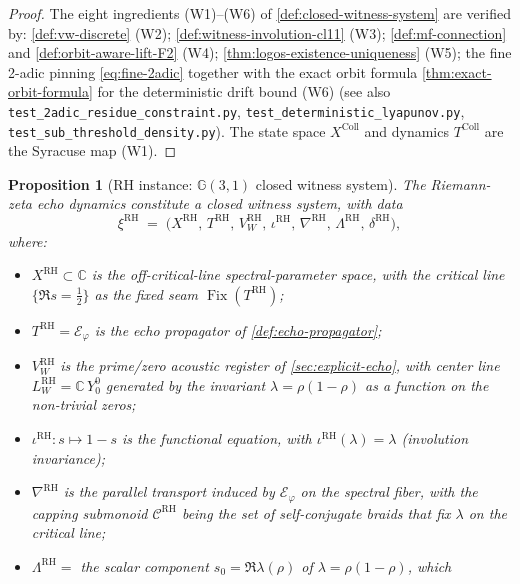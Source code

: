 \documentclass[11pt,a4paper]{article}
\theoremstyle{plain}
\newtheorem{proposition}[theorem]{Proposition}
\theoremstyle{definition}
\theoremstyle{remark}
\numberwithin{equation}{section}
\newcommand{\Cl}{\mathbb{G}}
\newcommand{\Complex}{\mathbb{C}}
\newcommand{\vp}{\varphi}
\DeclareMathOperator{\Fix}{Fix}
\begin{document}
\begin{proof}
The eight ingredients (W1)--(W6) of \cref{def:closed-witness-system}
are verified by:
\cref{def:vw-discrete} (W2);
\cref{def:witness-involution-cl11} (W3);
\cref{def:mf-connection} and \cref{def:orbit-aware-lift-F2} (W4);
\cref{thm:logos-existence-uniqueness} (W5);
the fine 2-adic pinning \eqref{eq:fine-2adic} together with the
exact orbit formula \cref{thm:exact-orbit-formula} for the
deterministic drift bound (W6) (see also
\texttt{test\_2adic\_residue\_constraint.py},
\texttt{test\_deterministic\_lyapunov.py},
\texttt{test\_sub\_threshold\_density.py}).
The state space $X^{\text{Coll}}$ and dynamics $T^{\text{Coll}}$
are the Syracuse map (W1).
\end{proof}

\begin{proposition}[RH instance: $\Cl(3,1)$ closed witness system]
\label{prop:rh-closed-witness-system}
The Riemann-zeta echo dynamics constitute a closed witness
system, with data
\[
  \xi^{\text{RH}}\;=\;\bigl(
    X^{\text{RH}},\,T^{\text{RH}},\,V_W^{\text{RH}},\,
    \iota^{\text{RH}},\,\nabla^{\text{RH}},\,
    \Lambda^{\text{RH}},\,\delta^{\text{RH}}
  \bigr),
\]
where:
\begin{itemize}
  \item $X^{\text{RH}}\subset\Complex$ is the off-critical-line
        spectral-parameter space, with the critical line
        $\{\Re s=\tfrac12\}$ as the fixed seam $\Fix(T^{\text{RH}})$;
  \item $T^{\text{RH}}=\mathcal{E}_\vp$ is the echo propagator
        of \cref{def:echo-propagator};
  \item $V_W^{\text{RH}}$ is the prime/zero acoustic register of
        \cref{sec:explicit-echo}, with center line
        $L_W^{\text{RH}}=\Complex\,Y_0^0$ generated by the
        invariant $\lambda=\rho(1-\rho)$ as a function on the
        non-trivial zeros;
  \item $\iota^{\text{RH}}:s\mapsto 1-s$ is the functional
        equation, with $\iota^{\text{RH}}(\lambda)=\lambda$
        (involution invariance);
  \item $\nabla^{\text{RH}}$ is the parallel transport induced
        by $\mathcal{E}_\vp$ on the spectral fiber, with the
        capping submonoid $\mathcal{C}^{\text{RH}}$ being the
        set of self-conjugate braids that fix $\lambda$ on the
        critical line;
  \item $\Lambda^{\text{RH}}=$ the scalar component
        $s_0=\Re\lambda(\rho)$ of $\lambda=\rho(1-\rho)$, which

\end{itemize}
\end{proposition}
\end{document}
